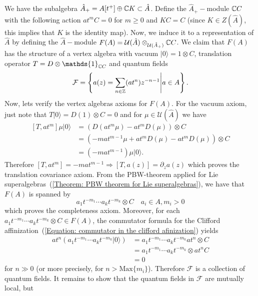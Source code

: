  We have the subalgebra $\hat{A}_+=A[t^+]\oplus\mathbb{C}K\subset \hat{A}$. Define the $\hat{A}_+-$module $\mathbb{C}C$ with the following action $at^mC=0$ for $m\geq0$ and $KC =C$ (since $K\in Z(\hat{A})$, this implies that $K$ is the identity map). Now, we induce it to a representation of $\hat{A}$ by defining the $\hat{A}-$module $F(A)=\mathcal{U}(\hat{A})\otimes_{\mathcal{U}(\hat{A}_+)}\mathbb{C}C$. We claim that $F(A)$ has the structure of a vertex algebra with vacuum $|0\rangle=1\otimes C$, translation operator $T=D\otimes \mathds{1}_{\bb{C}C}$ and quantum fields
 \begin{equation}
     \mathcal{F}=\left\{a(z)=\sum_{n\in\mathbb{Z}}(at^n)z^{-n-1}\Bigg|a\in A\right\}.
 \end{equation}
 Now, lets verify the vertex algebras axioms for $F(A)$. For the vacuum axiom, just note that $T|0\rangle = D(1)\otimes C=0$ and for $\mu\in\mathcal{U}(\hat{A})$ we have
 \begin{equation}
 \begin{split}
      [T,at^m]\mu|0\rangle &= (D(at^m\mu)-at^mD(\mu))\otimes C\\
      &=(-mat^{m-1}\mu+at^mD(\mu)-at^mD(\mu))\otimes C\\
      &=(-mat^{m-1})\mu|0\rangle.
 \end{split}
 \end{equation}
 Therefore $[T,at^m]=-mat^{m-1}\Rightarrow [T,a(z)]=\partial_za(z)$ which proves the translation covariance axiom. From the PBW-theorem applied for Lie superalgebras~(\ref{Theorem: PBW theorem for Lie superalgebras}), we have that $F(A)$ is spanned by
 \begin{equation}
     a_1t^{-m_1}\cdots a_kt^{-m_k}\otimes C\quad a_i\in A, m_i>0
 \end{equation}
 which proves the completeness axiom. Moreover, for each $a_1t^{-m_1}\cdots a_kt^{-m_k}\otimes C\in F(A)$, the commutator formula for the Clifford affinization~(\ref{Equation: commutator in the clifford afinization}) yields
 \begin{equation}
     \begin{split}
         at^n (a_1t^{-m_1}\cdots a_kt^{-m_k}|0\rangle)&= a_1t^{-m_1}\cdots a_kt^{-m_k}at^n\otimes C\\
         &=a_1t^{-m_1}\cdots a_kt^{-m_k}\otimes at^nC\\
         &=0
     \end{split}
 \end{equation}
 for $n\gg 0$ (or more precisely, for $n>\text{Max}\{m_i\}$). Therefore $\mathcal{F}$ is a collection of quantum fields. It remains to show that the quantum fields in $\mathcal{F}$ are mutually local, but
